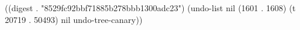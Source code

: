 
((digest . "8529fc92bbf71885b278bbb1300adc23") (undo-list nil (1601 . 1608) (t 20719 . 50493) nil undo-tree-canary))

